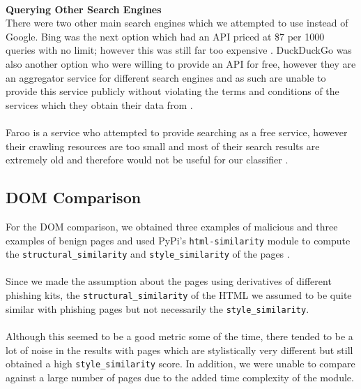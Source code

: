 \documentclass[12pt,twoside]{report}
\begin{document}
~\\
\textbf{Querying Other Search Engines}\\
There were two other main search engines which we attempted to use instead of Google. Bing was the next option which had an API priced at \$7 per 1000 queries with no limit; however this was still far too expensive \cite{bing}. DuckDuckGo was also another option who were willing to provide an API for free, however they are an aggregator service for different search engines and as such are unable to provide this service publicly without violating the terms and conditions of the services which they obtain their data from \cite{duckduckgo}.
\\\\
Faroo is a service who attempted to provide searching as a free service, however their crawling resources are too small and most of their search results are extremely old and therefore would not be useful for our classifier \cite{faroo}.
\subsection{DOM Comparison}
For the DOM comparison, we obtained three examples of malicious and three examples of benign pages and used PyPi's \texttt{html-similarity} module to compute the \texttt{structural\_similarity} and \texttt{style\_similarity} of the pages \cite{pypi}.
\\\\
Since we made the assumption about the pages using derivatives of different phishing kits, the \texttt{structural\_similarity} of the HTML we assumed to be quite similar with phishing pages but not necessarily the \texttt{style\_similarity}.
\\\\
Although this seemed to be a good metric some of the time, there tended to be a lot of noise in the results with pages which are stylistically very different but still obtained a high \texttt{style\_similarity} score. In addition, we were unable to compare against a large number of pages due to the added time complexity of the module.
\end{document}

